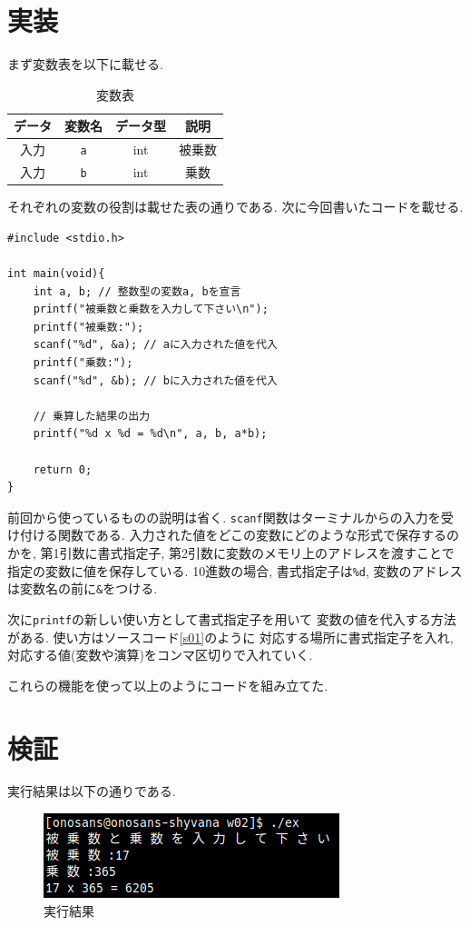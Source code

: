 \documentclass[a4paper, xelatex, ja=standard]{bxjsarticle}
\begin{document}
\section{実装}
まず変数表を以下に載せる.

\begin{table}[h]
\centering
\caption{変数表}
\label{}
\begin{tabular}{|c|c|c|c|}
\hline
データ & 変数名                         & データ型 & 説明  \\ \hline
入力  & \texttt{a} & int  & 被乗数 \\ \hline
入力  & \texttt{b} & int  & 乗数  \\ \hline
\end{tabular}
\end{table}

それぞれの変数の役割は載せた表の通りである.
次に今回書いたコードを載せる.

\begin{lstlisting}[caption=ソースコード,label=s01]
#include <stdio.h>

int main(void){
	int a, b; // 整数型の変数a, bを宣言
	printf("被乗数と乗数を入力して下さい\n");
	printf("被乗数:");
	scanf("%d", &a); // aに入力された値を代入
	printf("乗数:");
	scanf("%d", &b); // bに入力された値を代入

	// 乗算した結果の出力
	printf("%d x %d = %d\n", a, b, a*b);

	return 0;
}
\end{lstlisting}

前回から使っているものの説明は省く.
\texttt{scanf}関数はターミナルからの入力を受け付ける関数である.
入力された値をどこの変数にどのような形式で保存するのかを,
第1引数に書式指定子, 第2引数に変数のメモリ上のアドレスを渡すことで
指定の変数に値を保存している.
10進数の場合, 書式指定子は\texttt{\%d},
変数のアドレスは変数名の前に\texttt{\&}をつける.

次に\texttt{printf}の新しい使い方として書式指定子を用いて
変数の値を代入する方法がある.
使い方はソースコード\ref{s01}のように
対応する場所に書式指定子を入れ,
対応する値(変数や演算)をコンマ区切りで入れていく.

これらの機能を使って以上のようにコードを組み立てた.

\section{検証}
実行結果は以下の通りである.

\begin{figure}[h]
\centering
\includegraphics[scale=1.0]{../img/terminal_result.png}
\caption{実行結果}
\label{}
\end{figure}
\end{document}
